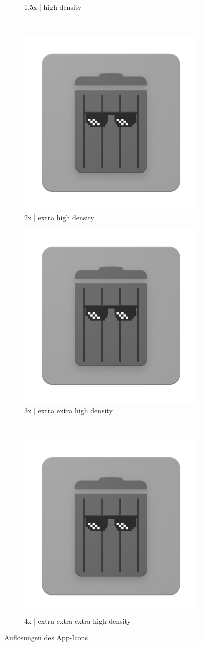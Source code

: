 \documentclass[12pt, a4paper]{scrreprt}
\begin{document}
\begin{figure}[h]
\begin{subfigure}{.3\textwidth}
  \caption{1.5x | high density}
  \label{fig:15}
\end{subfigure}%
\\
\begin{subfigure}{.5\textwidth}
  \centering
  \includegraphics[width=0.375\linewidth]{../graphical/icon/2x/ic_material_product_icon_192pxxhdpi.png}
  \caption{2x | extra high density}
  \label{fig:2}
\end{subfigure}%
\begin{subfigure}{.5\textwidth}
  \centering
  \includegraphics[width=.5\linewidth]{../graphical/icon/3x/ic_material_product_icon_192pxxxhdpi.png}
  \caption{3x | extra extra high density}
  \label{fig:3}
\end{subfigure}%
\\
\begin{subfigure}{\textwidth}
  \centering
  \includegraphics[width=.375\linewidth]{../graphical/icon/4x/ic_material_product_icon_192pxxxxhdpi.png}
  \caption{4x | extra extra extra high density}
  \label{fig:4}
\end{subfigure}%
\caption{Auflösungen des App-Icons}
\label{fig:aufl}
\end{figure}



\end{document}
